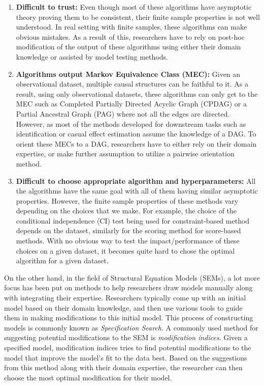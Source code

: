 \documentclass[letterpaper]{article} %
\begin{document}
\begin{enumerate}
	\item \textbf{Difficult to trust: } Even though most of these algorithms
		have asymptotic theory proving them to be consistent, their
		finite sample properties is not well understood. In real
		setting with finite samples, these algorithms can make obvious
		mistakes. As a result of this, researchers have to rely on
		post-hoc modification of the output of these algorithms
		using either their domain knowledge or assisted by model testing
		methods.
	\item \textbf{Algorithms output Markov Equivalence Class (MEC):} Given an 
		observational dataset, multiple causal structures can be
		faithful to it. As a result, using only observational datasets,
		these algorithms can only get to the MEC such as Completed
		Partially Directed Acyclic Graph (CPDAG) or a Partial Ancestral
		Graph (PAG) where not all the edges are directed. However, as
		most of the methods developed for downstream tasks such as
		identification or casual effect estimation assume the knowledge
		of a DAG. To orient these MECs to a DAG, researchers have to
		either rely on their domain expertise, or make further
		assumption to utilize a pairwise orientation method.
	\item \textbf{Difficult to choose appropriate algorithm and
		hyperparameters:} All the algorithms have the same goal with
		all of them having similar asymptotic properties. However, the
		finite sample properties of these methods vary depending on the
		choices that we make. For example, the choice of the
		conditional independence (CI) test being used for
		constraint-based method depends on the dataset, similarly for
		the scoring method for score-based methods. With no obvious way
		to test the impact/performance of these choices on a given
		dataset, it becomes quite hard to chose the optimal algorithm
		for a given dataset.
\end{enumerate}

On the other hand, in the field of Structural Equation Models (SEMs), a lot
more focus has been put on methods to help researchers draw models manually
along with integrating their expertise. Researchers typically come up with an
initial model based on their domain knowledge, and then use various tools to
guide them in making modifications to this initial model. This process of
constructing models is commonly known as \emph{Specification Search}. A
commonly used method for suggesting potential modifications to the SEM is
\emph{modification indices}. Given a specified model, modification indices
tries to find potential modifications to the model that improve the model's fit
to the data best. Based on the suggestions from this method along with their
domain expertise, the researcher can then choose the most optimal modification
for their model.
\end{document}
